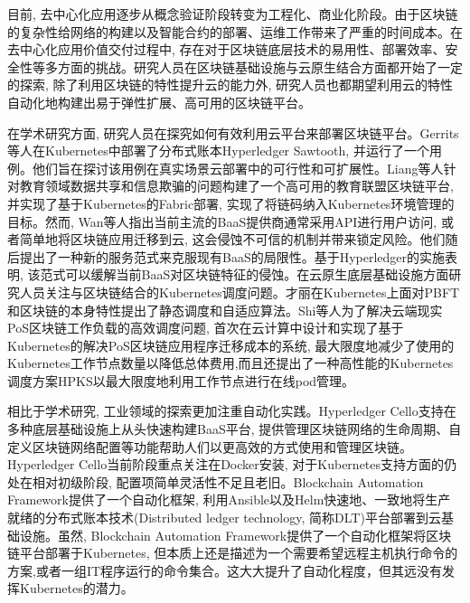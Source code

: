 目前, 去中心化应用逐步从概念验证阶段转变为工程化、商业化阶段。由于区块链的复杂性给网络的构建以及智能合约的部署、运维工作带来了严重的时间成本。在去中心化应用价值交付过程中, 存在对于区块链底层技术的易用性、部署效率、安全性等多方面的挑战。研究人员在区块链基础设施与云原生结合方面都开始了一定的探索, 除了利用区块链的特性提升云的能力外\cite{DBLP:journals/comcom/XieZZWH21}\cite{DBLP:conf/smartcloud/SunWY20}\cite{8457813}, 研究人员也都期望利用云的特性自动化地构建出易于弹性扩展、高可用的区块链平台。

在学术研究方面, 研究人员在探究如何有效利用云平台来部署区块链平台。Gerrits等人\cite{DBLP:conf/coins/GerritsKKFV21}在Kubernetes中部署了分布式账本Hyperledger Sawtooth\footnotemark[1], 并运行了一个用例。他们旨在探讨该用例在真实场景云部署中的可行性和可扩展性。Liang等人\cite{liangeduchain}针对教育领域数据共享和信息欺骗的问题构建了一个高可用的教育联盟区块链平台, 并实现了基于Kubernetes的Fabric部署, 实现了将链码纳入Kubernetes环境管理的目标。然而, Wan等人\cite{wan2018novel}指出当前主流的BaaS提供商通常采用API进行用户访问, 或者简单地将区块链应用迁移到云, 这会侵蚀不可信的机制并带来锁定风险。他们随后提出了一种新的服务范式来克服现有BaaS的局限性。基于Hyperledger的实施表明, 该范式可以缓解当前BaaS对区块链特征的侵蚀。在云原生底层基础设施方面研究人员关注与区块链结合的Kubernetes调度问题。才丽\cite{caili2018}在Kubernetes上面对PBFT和区块链的本身特性提出了静态调度和自适应算法。Shi等人\cite{9582270}为了解决云端现实PoS区块链工作负载的高效调度问题, 首次在云计算中设计和实现了基于Kubernetes的解决PoS区块链应用程序迁移成本的系统, 最大限度地减少了使用的Kubernetes工作节点数量以降低总体费用,而且还提出了一种高性能的Kubernetes调度方案HPKS以最大限度地利用工作节点进行在线pod管理。

相比于学术研究, 工业领域的探索更加注重自动化实践。Hyperledger Cello\footnotemark[1]支持在多种底层基础设施上从头快速构建BaaS平台, 提供管理区块链网络的生命周期、自定义区块链网络配置等功能帮助人们以更高效的方式使用和管理区块链。Hyperledger Cello当前阶段重点关注在Docker安装, 对于Kubernetes支持方面的仍处在相对初级阶段, 配置项简单灵活性不足且老旧。Blockchain Automation Framework\footnotemark[2]提供了一个自动化框架, 利用Ansible\footnotemark[3]以及Helm\footnotemark[4]快速地、一致地将生产就绪的分布式账本技术(Distributed ledger technology, 简称DLT)平台部署到云基础设施。虽然, Blockchain Automation Framework提供了一个自动化框架将区块链平台部署于Kubernetes, 但本质上还是描述为一个需要希望远程主机执行命令的方案,或者一组IT程序运行的命令集合。这大大提升了自动化程度，但其远没有发挥Kubernetes的潜力。

